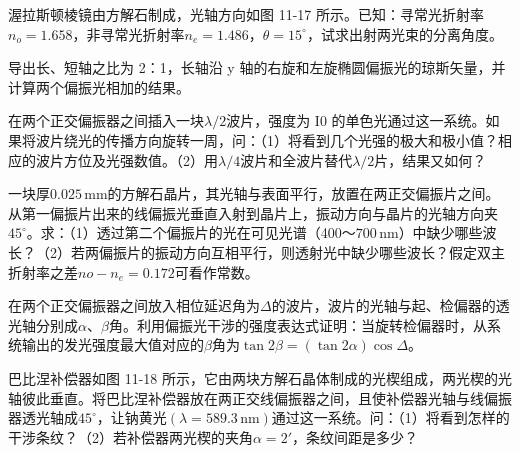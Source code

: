 \documentclass[standard, analysis, notocnum]{ExBook}
\newcommand{\answerarea}[1][8cm]{%
  \par\vspace{2mm}%
  \noindent{\color{themeColor!35}\rule{\linewidth}{0.4pt}}\par
  \noindent\begin{minipage}[t][#1][t]{\linewidth}\vspace{0pt}\end{minipage}\par
  \noindent{\color{themeColor!35}\rule{\linewidth}{0.4pt}}\par
}
\begin{document}
\begin{qitems}[startnum=4]
\qitem 渥拉斯顿棱镜由方解石制成，光轴方向如图 11-17 所示。已知：寻常光折射率$n_{o}=1.658$，非寻常光折射率$n_{e}=1.486$，$\theta =15^{\circ}$，试求出射两光束的分离角度。
\label{q:275:start}
\answerarea[8cm]
\label{q:275:end}
\end{qitems}

\begin{qitems}[startnum=5]
\qitem 导出长、短轴之比为 2：1，长轴沿 y 轴的右旋和左旋椭圆偏振光的琼斯矢量，并计算两个偏振光相加的结果。
\label{q:276:start}
\answerarea[8cm]
\label{q:276:end}
\end{qitems}

\begin{qitems}[startnum=6]
\qitem 在两个正交偏振器之间插入一块$\lambda /2$波片，强度为 I0 的单色光通过这一系统。如果将波片绕光的传播方向旋转一周，问：（1）将看到几个光强的极大和极小值？相应的波片方位及光强数值。（2）用$\lambda /4$波片和全波片替代$\lambda /2$片，结果又如何？
\label{q:277:start}
\answerarea[8cm]
\label{q:277:end}
\end{qitems}

\begin{qitems}[startnum=7]
\qitem 一块厚$0.025\,\mathrm{mm}$的方解石晶片，其光轴与表面平行，放置在两正交偏振片之间。从第一偏振片出来的线偏振光垂直入射到晶片上，振动方向与晶片的光轴方向夹$45^{\circ}$。求：（1）透过第二个偏振片的光在可见光谱（400～$700\,\mathrm{nm}$）中缺少哪些波长？（2）若两偏振片的振动方向互相平行，则透射光中缺少哪些波长？假定双主折射率之差$no-n_{e}=0.172$可看作常数。
\label{q:278:start}
\answerarea[8cm]
\label{q:278:end}
\end{qitems}

\begin{qitems}[startnum=8]
\qitem 在两个正交偏振器之间放入相位延迟角为$\Delta$的波片，波片的光轴与起、检偏器的透光轴分别成$\alpha$、$\beta$角。利用偏振光干涉的强度表达式证明：当旋转检偏器时，从系统输出的发光强度最大值对应的$\beta$角为$\tan 2\beta =(\tan 2\alpha )\cos \Delta$。
\label{q:279:start}
\answerarea[8cm]
\label{q:279:end}
\end{qitems}

\begin{qitems}[startnum=9]
\qitem 巴比涅补偿器如图 11-18 所示，它由两块方解石晶体制成的光楔组成，两光楔的光轴彼此垂直。将巴比涅补偿器放在两正交线偏振器之间，且使补偿器光轴与线偏振器透光轴成$45^{\circ}$，让钠黄光$(\lambda =589.3\,\mathrm{nm})$通过这一系统。问：（1）将看到怎样的干涉条纹？（2）若补偿器两光楔的夹角$\alpha =2'$，条纹间距是多少？
\label{q:280:start}
\answerarea[8cm]
\label{q:280:end}
\end{qitems}
\end{document}
